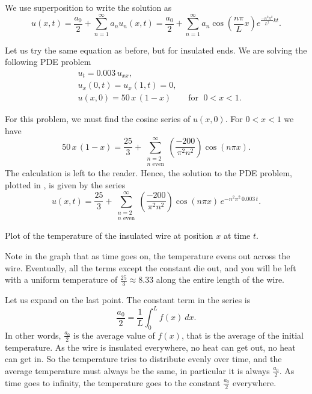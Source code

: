 We use superposition to write the solution as
\begin{equation*}
\boxed{~~
u(x,t) = 
\frac{a_0}{2} + 
\sum_{n=1}^\infty
a_n
u_n(x,t)
=
\frac{a_0}{2} + 
\sum_{n=1}^\infty
a_n
\cos \left( \frac{n \pi}{L} x \right)
e^{\frac{-n^2 \pi^2}{L^2} k t} .
~~}
\end{equation*}

\begin{example}
Let us try the same equation as before, but for insulated ends.
We are solving the following PDE problem
\begin{align*}
& u_t = 0.003 \, u_{xx} , \\
& u_x(0,t) = u_x(1,t) = 0 , \\
& u(x,0) = 50\,x\,(1-x) \qquad \text{for } \; 0 < x < 1 .
\end{align*}

For this problem, we must find the cosine series of $u(x,0)$.
For $0 < x < 1$ we have
\begin{equation*}
50\, x\,(1-x)
=
\frac{25}{3} +
\sum_{\substack{n=2 \\ n \text{ even}}}^\infty
\left( \frac{-200}{\pi^2 n^2} \right)
\cos (n \pi x) .
\end{equation*}
The calculation is left to the reader.
Hence, the solution to the PDE problem, plotted in
, is given by the series
\begin{equation*}
u(x,t)
=
\frac{25}{3} +
\sum_{\substack{n=2 \\ n \text{ even}}}^\infty
\left( \frac{-200}{\pi^2 n^2} \right)
\cos ( n \pi x)
\, e^{-n^2 \pi^2 \, 0.003 \, t} .
\end{equation*}

\begin{myfig}
\capstart
{}
\caption{Plot of the temperature of the insulated wire at position $x$
at time $t$.\label{heat:wireisolexfig}}
\end{myfig}

Note in the graph
that as time goes on, the temperature evens out across the wire.  Eventually, all the
terms except the constant
die out, and you will be left with a uniform temperature
of $\frac{25}{3} \approx 8.33$ along the entire length of the wire.
\end{example}

Let us expand on the last point.  The constant term in the series is
\begin{equation*}
\frac{a_0}{2} = \frac{1}{L} \int_0^L f(x) ~ dx .
\end{equation*}
In other words, $\frac{a_0}{2}$ is the average value of $f(x)$, that is
the average of the initial temperature.  As the wire is insulated
everywhere, no heat can get out, no heat can get in.  So the temperature
tries to distribute evenly over time, and the average temperature must always be the
same, in particular it is always $\frac{a_0}{2}$.  As time goes to
infinity, the temperature goes to the constant $\frac{a_0}{2}$ everywhere.

